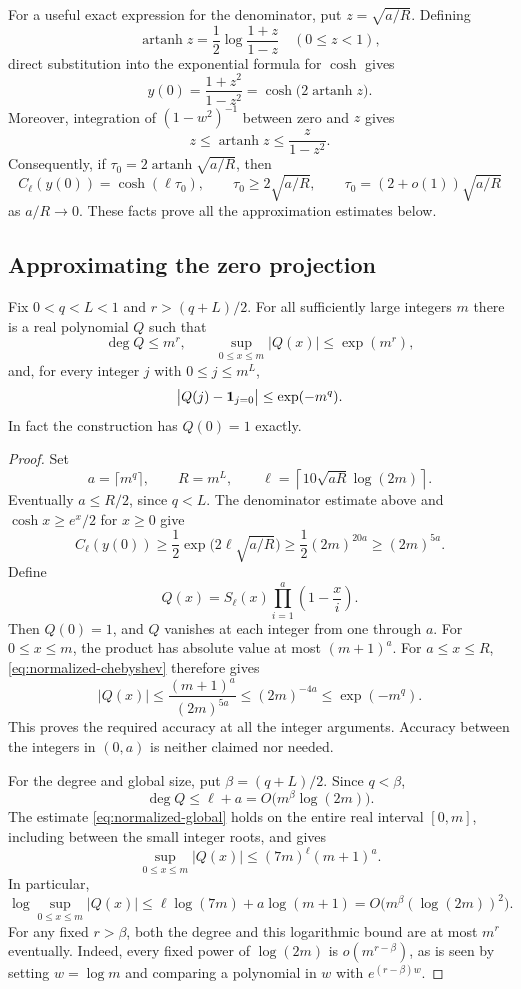 For a useful exact expression for the denominator, put $z=\sqrt{a/R}$.
Defining
\[
 \operatorname{artanh}z=\frac12\log\frac{1+z}{1-z}
 \quad(0\le z<1),
\]
direct substitution into the exponential formula for $\cosh$ gives
\[
 y(0)=\frac{1+z^2}{1-z^2}
      =\cosh\bigl(2\operatorname{artanh}z\bigr).
\]
Moreover, integration of $(1-w^2)^{-1}$ between zero and $z$ gives
\begin{equation}
 z\le\operatorname{artanh}z\le\frac{z}{1-z^2}.
 \label{eq:artanh-bound}
\end{equation}
Consequently, if $\tau_0=2\operatorname{artanh}\sqrt{a/R}$, then
\[
 C_\ell(y(0))=\cosh(\ell\tau_0),\qquad
 \tau_0\ge2\sqrt{a/R},\qquad
 \tau_0=(2+o(1))\sqrt{a/R}
\]
as $a/R\to0$.  These facts prove all the approximation estimates below.

\subsection{Approximating the zero projection}

\begin{lemma}
\label{lem:zero-filter}
Fix $0<q<L<1$ and $r>(q+L)/2$.  For all sufficiently large integers $m$
there is a real polynomial $Q$ such that
\[
 \deg Q\le m^r,\qquad
 \sup_{0\le x\le m}|Q(x)|\le\exp(m^r),
\]
and, for every integer $j$ with $0\le j\le m^L$,
\[
 \bigl|Q(j)-\mathbf 1_{j=0}\bigr|\le\exp(-m^q).
\]
In fact the construction has $Q(0)=1$ exactly.
\end{lemma}

\begin{proof}
Set
\[
 a=\lceil m^q\rceil,\qquad R=m^L,\qquad
 \ell=\left\lceil10\sqrt{aR}\log(2m)\right\rceil.
\]
Eventually $a\le R/2$, since $q<L$.  The denominator estimate above and
$\cosh x\ge e^x/2$ for $x\ge0$ give
\[
 C_\ell(y(0))
 \ge\frac12\exp\bigl(2\ell\sqrt{a/R}\bigr)
 \ge\frac12(2m)^{20a}
 \ge(2m)^{5a}.
\]
Define
\[
 Q(x)=S_\ell(x)\prod_{i=1}^{a}\left(1-\frac{x}{i}\right).
\]
Then $Q(0)=1$, and $Q$ vanishes at each integer from one through $a$.
For $0\le x\le m$, the product has absolute value at most $(m+1)^a$.
For $a\le x\le R$, \eqref{eq:normalized-chebyshev} therefore gives
\[
 |Q(x)|\le\frac{(m+1)^a}{(2m)^{5a}}
       \le(2m)^{-4a}\le\exp(-m^q).
\]
This proves the required accuracy at all the integer arguments.  Accuracy
between the integers in $(0,a)$ is neither claimed nor needed.

For the degree and global size, put $\beta=(q+L)/2$.  Since $q<\beta$,
\[
 \deg Q\le\ell+a=O\bigl(m^\beta\log(2m)\bigr).
\]
The estimate \eqref{eq:normalized-global} holds on the entire real
interval $[0,m]$, including between the small integer roots, and gives
\[
 \sup_{0\le x\le m}|Q(x)|\le(7m)^\ell(m+1)^a.
\]
In particular,
\[
 \log\sup_{0\le x\le m}|Q(x)|
 \le\ell\log(7m)+a\log(m+1)
 =O\bigl(m^\beta(\log(2m))^2\bigr).
\]
For any fixed $r>\beta$, both the degree and this logarithmic bound are
at most $m^r$ eventually.  Indeed, every fixed power of $\log(2m)$ is
$o(m^{r-\beta})$, as is seen by setting $w=\log m$ and comparing a
polynomial in $w$ with $e^{(r-\beta)w}$.
\end{proof}

